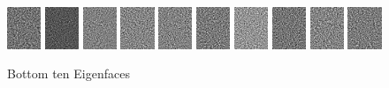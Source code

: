 \begin{figure}[hbt]
  \includegraphics[width=0.09\textwidth]{../results/H_rez/eigenfaces/smallest1.jpg}
  \includegraphics[width=0.09\textwidth]{../results/H_rez/eigenfaces/smallest2.jpg}
  \includegraphics[width=0.09\textwidth]{../results/H_rez/eigenfaces/smallest3.jpg}
  \includegraphics[width=0.09\textwidth]{../results/H_rez/eigenfaces/smallest4.jpg}
  \includegraphics[width=0.09\textwidth]{../results/H_rez/eigenfaces/smallest5.jpg}
  \includegraphics[width=0.09\textwidth]{../results/H_rez/eigenfaces/smallest6.jpg}
  \includegraphics[width=0.09\textwidth]{../results/H_rez/eigenfaces/smallest7.jpg}
  \includegraphics[width=0.09\textwidth]{../results/H_rez/eigenfaces/smallest8.jpg}
  \includegraphics[width=0.09\textwidth]{../results/H_rez/eigenfaces/smallest9.jpg}
  \includegraphics[width=0.09\textwidth]{../results/H_rez/eigenfaces/smallest10.jpg}
  \caption{Bottom ten Eigenfaces}
  \label{fig:bot_efaces}
\end{figure}

